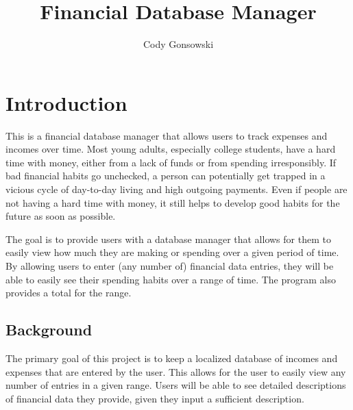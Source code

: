 \documentclass[10pt,conference,onecolumn,compsoc]{IEEEtran}
\begin{document}
\title{Financial Database Manager}

\author{Cody Gonsowski}%



\maketitle


\IEEEdisplaynontitleabstractindextext
\IEEEpeerreviewmaketitle


\section{Introduction}
This is a financial database manager that allows users to track expenses and incomes over time. Most young adults, especially college students, have a hard time with money, either from a lack of funds or from spending irresponsibly. If bad financial habits go unchecked, a person can potentially get trapped in a vicious cycle of day-to-day living and high outgoing payments. Even if people are not having a hard time with money, it still helps to develop good habits for the future as soon as possible.

The goal is to provide users with a database manager that allows for them to easily view how much they are making or spending over a given period of time. By allowing users to enter (any number of) financial data entries, they will be able to easily see their spending habits over a range of time. The program also provides a total for the range.


\subsection{Background}
The primary goal of this project is to keep a localized database of incomes and expenses that are entered by the user. This allows for the user to easily view any number of entries in a given range. Users will be able to see detailed descriptions of financial data they provide, given they input a sufficient description.
\end{document}
